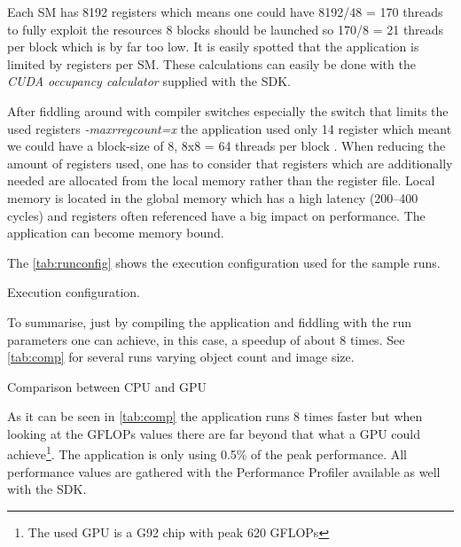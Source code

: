 Each \gls{SM} has 8192 registers which means one could have 8192/48 = 170 threads
to fully exploit the resources 8 blocks should be launched so 170/8 = 21 threads
per block which is by far too low. It is easily spotted that the application is
limited by registers per \gls{SM}. These calculations can easily be done with the
\emph{CUDA occupancy calculator} supplied with the SDK.

After fiddling around with compiler switches especially the switch that limits
the used registers \emph{-maxrregcount=x}
the application used only 14 register which meant we could have a block-size of
8, 8x8 = 64 threads per block . When reducing the amount of registers used, one
has to consider that registers which are additionally needed are allocated from
the local memory rather than the register file. Local memory is located in the
global memory which has a high latency (200--400 cycles) and registers often
referenced have a big impact on performance. The application can become memory
bound.

The \autoref{tab:runconfig} shows the execution configuration used for the sample runs. 

\begin{table}[ht]
	\centering
  	\caption[Execution configuration]{Execution configuration.}	
	\label{tab:runconfig}
\end{table}



To summarise, just by compiling the application and fiddling with the run
parameters one can achieve, in this case, a speedup of about 8 times. See
\autoref{tab:comp} for several runs varying object count and image size.

\begin{table}[ht]
	\centering
	\caption{Comparison between \protect\gls{CPU} and \protect\gls{GPU}}
	\label{tab:comp}
\end{table}
	
	
As it can be seen in \autoref{tab:comp} the application runs 8 times faster but
when looking at the \glspl{GFLOP} values there are far beyond that what a
\gls{GPU} could achieve\footnote{The used \gls{GPU} is a G92 chip with peak 620
\glspl{GFLOP}}. The application is only using 0.5\% of the peak performance. All
performance values are gathered with the {} Performance
Profiler available as well with the \gls{SDK}.

